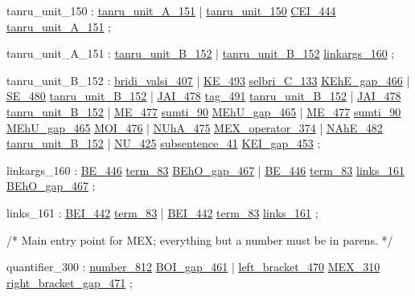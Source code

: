 \label{html:y150}
tanru_unit_150          :  \hyperref[html:y151]{tanru_unit_A_151}
                        |  \hyperref[html:y150]{tanru_unit_150}  \hyperref[html:y444]{CEI_444}  \hyperref[html:y151]{tanru_unit_A_151}
                        ;

\label{html:y151}
tanru_unit_A_151        :  \hyperref[html:y152]{tanru_unit_B_152}
                        |  \hyperref[html:y152]{tanru_unit_B_152}  \hyperref[html:y160]{linkargs_160}
                        ;

\label{html:y152}
tanru_unit_B_152        :  \hyperref[html:y407]{bridi_valsi_407}
                        |  \hyperref[html:y493]{KE_493}  \hyperref[html:y133]{selbri_C_133}  \hyperref[html:y466]{KEhE_gap_466}
                        |  \hyperref[html:y480]{SE_480}  \hyperref[html:y152]{tanru_unit_B_152}
                        |  \hyperref[html:y478]{JAI_478}  \hyperref[html:y491]{tag_491}  \hyperref[html:y152]{tanru_unit_B_152}
                        |  \hyperref[html:y478]{JAI_478}  \hyperref[html:y152]{tanru_unit_B_152}
                        |  \hyperref[html:y477]{ME_477}  \hyperref[html:y90]{sumti_90}  \hyperref[html:y465]{MEhU_gap_465}
                        |  \hyperref[html:y477]{ME_477}  \hyperref[html:y90]{sumti_90}  \hyperref[html:y465]{MEhU_gap_465}  \hyperref[html:y476]{MOI_476}
                        |  \hyperref[html:y475]{NUhA_475}  \hyperref[html:y374]{MEX_operator_374}
                        |  \hyperref[html:y482]{NAhE_482}  \hyperref[html:y152]{tanru_unit_B_152}
                        |  \hyperref[html:y425]{NU_425}  \hyperref[html:y41]{subsentence_41}  \hyperref[html:y453]{KEI_gap_453}
                        ;

\label{html:y160}
linkargs_160            :  \hyperref[html:y446]{BE_446}  \hyperref[html:y83]{term_83}  \hyperref[html:y467]{BEhO_gap_467}
                        |  \hyperref[html:y446]{BE_446}  \hyperref[html:y83]{term_83}  \hyperref[html:y161]{links_161}  \hyperref[html:y467]{BEhO_gap_467}
                        ;

\label{html:y161}
links_161               :  \hyperref[html:y442]{BEI_442}  \hyperref[html:y83]{term_83}
                        |  \hyperref[html:y442]{BEI_442}  \hyperref[html:y83]{term_83}  \hyperref[html:y161]{links_161}
                        ;

/*  Main entry point for MEX; everything but a number must be in parens.   */

\label{html:y300}
quantifier_300          :  \hyperref[html:y812]{number_812}  \hyperref[html:y461]{BOI_gap_461}
                        |  \hyperref[html:y470]{left_bracket_470}  \hyperref[html:y310]{MEX_310}  \hyperref[html:y471]{right_bracket_gap_471}
                        ;

